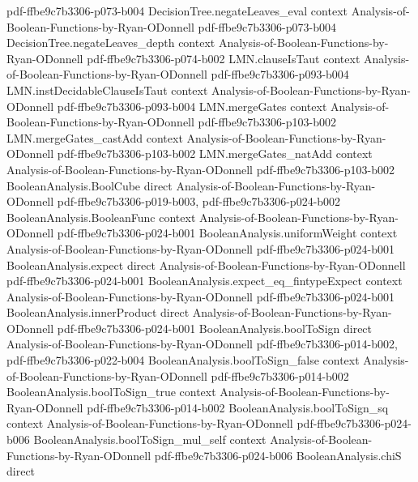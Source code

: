\begin{theorem}
  {pdf-ffbe9c7b3306-p073-b004}
\proofstep
  {DecisionTree.negateLeaves_eval}
  {context}
  {Analysis-of-Boolean-Functions-by-Ryan-ODonnell}
  {pdf-ffbe9c7b3306-p073-b004}
\proofstep
  {DecisionTree.negateLeaves_depth}
  {context}
  {Analysis-of-Boolean-Functions-by-Ryan-ODonnell}
  {pdf-ffbe9c7b3306-p074-b002}
\proofstep
  {LMN.clauseIsTaut}
  {context}
  {Analysis-of-Boolean-Functions-by-Ryan-ODonnell}
  {pdf-ffbe9c7b3306-p093-b004}
\proofstep
  {LMN.instDecidableClauseIsTaut}
  {context}
  {Analysis-of-Boolean-Functions-by-Ryan-ODonnell}
  {pdf-ffbe9c7b3306-p093-b004}
\proofstep
  {LMN.mergeGates}
  {context}
  {Analysis-of-Boolean-Functions-by-Ryan-ODonnell}
  {pdf-ffbe9c7b3306-p103-b002}
\proofstep
  {LMN.mergeGates_castAdd}
  {context}
  {Analysis-of-Boolean-Functions-by-Ryan-ODonnell}
  {pdf-ffbe9c7b3306-p103-b002}
\proofstep
  {LMN.mergeGates_natAdd}
  {context}
  {Analysis-of-Boolean-Functions-by-Ryan-ODonnell}
  {pdf-ffbe9c7b3306-p103-b002}
\proofstep
  {BooleanAnalysis.BoolCube}
  {direct}
  {Analysis-of-Boolean-Functions-by-Ryan-ODonnell}
  {pdf-ffbe9c7b3306-p019-b003,
    pdf-ffbe9c7b3306-p024-b002}
\proofstep
  {BooleanAnalysis.BooleanFunc}
  {context}
  {Analysis-of-Boolean-Functions-by-Ryan-ODonnell}
  {pdf-ffbe9c7b3306-p024-b001}
\proofstep
  {BooleanAnalysis.uniformWeight}
  {context}
  {Analysis-of-Boolean-Functions-by-Ryan-ODonnell}
  {pdf-ffbe9c7b3306-p024-b001}
\proofstep
  {BooleanAnalysis.expect}
  {direct}
  {Analysis-of-Boolean-Functions-by-Ryan-ODonnell}
  {pdf-ffbe9c7b3306-p024-b001}
\proofstep
  {BooleanAnalysis.expect_eq_fintypeExpect}
  {context}
  {Analysis-of-Boolean-Functions-by-Ryan-ODonnell}
  {pdf-ffbe9c7b3306-p024-b001}
\proofstep
  {BooleanAnalysis.innerProduct}
  {direct}
  {Analysis-of-Boolean-Functions-by-Ryan-ODonnell}
  {pdf-ffbe9c7b3306-p024-b001}
\proofstep
  {BooleanAnalysis.boolToSign}
  {direct}
  {Analysis-of-Boolean-Functions-by-Ryan-ODonnell}
  {pdf-ffbe9c7b3306-p014-b002,
    pdf-ffbe9c7b3306-p022-b004}
\proofstep
  {BooleanAnalysis.boolToSign_false}
  {context}
  {Analysis-of-Boolean-Functions-by-Ryan-ODonnell}
  {pdf-ffbe9c7b3306-p014-b002}
\proofstep
  {BooleanAnalysis.boolToSign_true}
  {context}
  {Analysis-of-Boolean-Functions-by-Ryan-ODonnell}
  {pdf-ffbe9c7b3306-p014-b002}
\proofstep
  {BooleanAnalysis.boolToSign_sq}
  {context}
  {Analysis-of-Boolean-Functions-by-Ryan-ODonnell}
  {pdf-ffbe9c7b3306-p024-b006}
\proofstep
  {BooleanAnalysis.boolToSign_mul_self}
  {context}
  {Analysis-of-Boolean-Functions-by-Ryan-ODonnell}
  {pdf-ffbe9c7b3306-p024-b006}
\proofstep
  {BooleanAnalysis.chiS}
  {direct}

\end{theorem}

